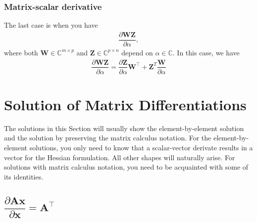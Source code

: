 \documentclass{article}
\newcommand{\trans}{\top}
\begin{document}
\subsubsection{Matrix-scalar derivative}
The last case is when you have
\begin{align}
    \dfrac{\partial \mathbf{W}\mathbf{Z}}{\partial \alpha},
\end{align}
where both \(\mathbf{W} \in \mathbb{C}^{m \times p}\) and \(\mathbf{Z} \in \mathbb{C}^{p\times n}\) depend on \(\alpha \in \mathbb{C}\). In this case, we have
\begin{align}
    \label{eq:matrix-matrix-product-rule}
    \dfrac{\partial \mathbf{W}\mathbf{Z}}{\partial \alpha} = \dfrac{\partial \mathbf{Z}}{\partial \alpha}\mathbf{W}^{\trans} + \mathbf{Z}^{T} \dfrac{\mathbf{W}}{\partial \alpha}
\end{align}


\section{Solution of Matrix Differentiations}\label{sec:diff}
The solutions in this Section will usually show the element-by-element solution and the solution by preserving the matrix calculus notation. For the element-by-element solutions, you only need to know that a scalar-vector derivate results in a vector for the Hessian formulation. All other shapes will naturally arise. For solutions with matrix calculus notation, you need to be acquainted with some of its identities.

\subsection{\(\dfrac{\partial \mathbf{A} \mathbf{x}}{\partial \mathbf{x}} = \mathbf{A}^\trans\)}
\end{document}
